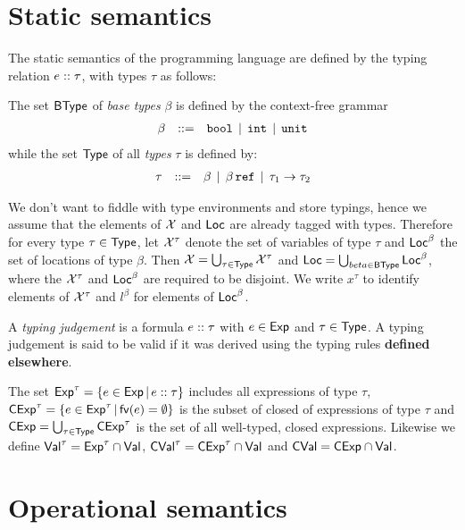 \documentclass[12pt,a4paper]{report}
\newcommand{\CExp}{\sstyle{CExp}}
\newcommand{\CVal}{\sstyle{CVal}}
\newcommand{\BType}{\sstyle{BType}}
\begin{document}

\section{Static semantics}

The static semantics of the programming language are defined by the typing relation
${e}\mathrel{::}{\tau}$, with types $\tau$ as follows:

\begin{definition}[Types]
  The set $\BType$ of {\em base types} $\beta$ is defined by the context-free grammar
  \[\begin{array}{rrlll}
  \beta & ::= & \mathtt{bool} \,\mid\, \mathtt{int} \,\mid\, \mathtt{unit}
  \end{array}\]
  while the set $\mathsf{Type}$ of all {\em types} $\tau$ is defined by:
  \[\begin{array}{rrlll}
  \tau & ::= & \beta \,\mid\, \beta\,\mathtt{ref} \,\mid\, \tau_1\to\tau_2
  \end{array}\]
\end{definition}

We don't want to fiddle with type environments and store typings, hence we assume that
the elements of $\mathcal{X}$ and $\mathsf{Loc}$ are already tagged with types. Therefore for every
type $\tau\in\mathsf{Type}$, let $\mathcal{X}^\tau$ denote the set of variables of type $\tau$ and $\mathsf{Loc}^\beta$ the
set of locations of type $\beta$. Then $\mathcal{X}=\bigcup_{\tau\in\mathsf{Type}}\mathcal{X}^\tau$ and
$\Loc=\bigcup_{beta\in\BType}\Loc^\beta$, where the $\mathcal{X}^\tau$ and $\mathsf{Loc}^\beta$ are
required to be disjoint. We write $x^\tau$ to identify elements of $\mathcal{X}^\tau$ and
$l^\beta$ for elements of $\mathsf{Loc}^\beta$.

\begin{definition}
  A {\em typing judgement} is a formula ${e}\mathrel{::}{\tau}$ with
  $e\in\mathsf{Exp}$ and $\tau\in\mathsf{Type}$. A typing judgement is said to
  be valid if it was derived using the typing rules {\bf defined
  elsewhere}.
\end{definition}

The set $\mathsf{Exp}^\tau = \{e\in\mathsf{Exp}\,|\,{e}\mathrel{::}{\tau}\}$ includes all expressions of type $\tau$,
$\CExp^\tau = \{e\in\Exp^\tau\,|\,\fv{e}=\emptyset\}$ is the subset of closed of expressions of
type $\tau$ and $\CExp = \bigcup_{\tau\in\Type} \CExp^\tau$ is the set of all well-typed, closed
expressions. Likewise we define $\mathsf{Val}^\tau = \mathsf{Exp}^\tau\cap\mathsf{Val}$, $\CVal^\tau = \CExp^\tau \cap \Val$
and $\CVal = \CExp \cap \Val$.



\section{Operational semantics}
\end{document}
